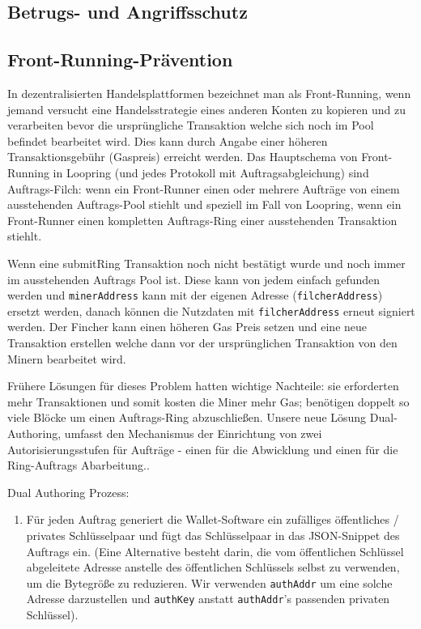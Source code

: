 \documentclass[UTF8,nofonts]{article}
\begin{document}
\begin{multicols}{2}
\section{Betrugs- und Angriffsschutz}

\subsection{Front-Running-Prävention\label{sec:dual_authoring}}

In dezentralisierten Handelsplattformen bezeichnet man als Front-Running, wenn jemand versucht eine Handelsstrategie eines anderen Konten zu kopieren und zu verarbeiten bevor die ursprüngliche Transaktion welche sich noch im Pool befindet bearbeitet wird. Dies kann durch Angabe einer höheren Transaktionsgebühr (Gaspreis) erreicht werden. Das Hauptschema von Front-Running in Loopring (und jedes Protokoll mit Auftragsabgleichung) sind Auftrags-Filch: wenn ein Front-Runner einen oder mehrere Aufträge von einem ausstehenden Auftrags-Pool stiehlt und speziell im Fall von Loopring, wenn ein Front-Runner einen kompletten Auftrags-Ring einer ausstehenden Transaktion stiehlt.

Wenn eine submitRing Transaktion noch nicht bestätigt wurde und noch immer im ausstehenden Auftrags Pool ist. Diese kann von jedem einfach gefunden werden und \verb|minerAddress| kann mit der eigenen Adresse (\verb|filcherAddress|) ersetzt werden, danach können die Nutzdaten mit \verb|filcherAddress| erneut signiert werden. Der Fincher kann einen höheren Gas Preis setzen und eine neue Transaktion erstellen welche dann vor der ursprünglichen Transaktion von den Minern bearbeitet wird.

Frühere Lösungen für dieses Problem hatten wichtige Nachteile: sie erforderten mehr Transaktionen und somit kosten die Miner mehr Gas; benötigen doppelt so viele Blöcke um einen Auftrags-Ring abzuschließen. Unsere neue Lösung Dual-Authoring\cite{dualauthor}, umfasst den Mechanismus der Einrichtung von zwei Autorisierungsstufen für Aufträge - einen für die Abwicklung und einen für die Ring-Auftrags Abarbeitung..

Dual Authoring Prozess: 

\begin{enumerate}

	\item Für jeden Auftrag generiert die Wallet-Software ein zufälliges öffentliches / privates Schlüsselpaar und fügt das Schlüsselpaar in das JSON-Snippet des Auftrags ein. (Eine Alternative besteht darin, die vom öffentlichen Schlüssel abgeleitete Adresse anstelle des öffentlichen Schlüssels selbst zu verwenden, um die Bytegröße zu reduzieren. Wir verwenden \verb|authAddr| um eine solche Adresse darzustellen und \verb|authKey| anstatt \verb|authAddr|'s passenden privaten Schlüssel).


\end{enumerate}
\end{multicols}
\end{document}
